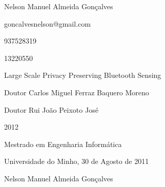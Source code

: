 \par\vspace{10mm}
 Nelson Manuel Almeida Gonçalves
\par\vspace{3mm}
 goncalvesnelson@gmail.com
\par\vspace{3mm}
 937528319
\par\vspace{3mm}
 13220550
\par\vspace{3mm}
 Large Scale Privacy Preserving Bluetooth Sensing
\par\vspace{3mm}
 Doutor Carlos Miguel Ferraz Baquero Moreno
\par\vspace{3mm}
 Doutor Rui João Peixoto José
\par\vspace{3mm}
 2012
\par\vspace{3mm}
 Mestrado em Engenharia Informática
\par\vspace{20mm}
\par\vspace{10mm}
\begin{center}
Universidade do Minho, 30 de Agosto de 2011
\par\vspace{3mm}
Nelson Manuel Almeida Gonçalves
\end{center}
